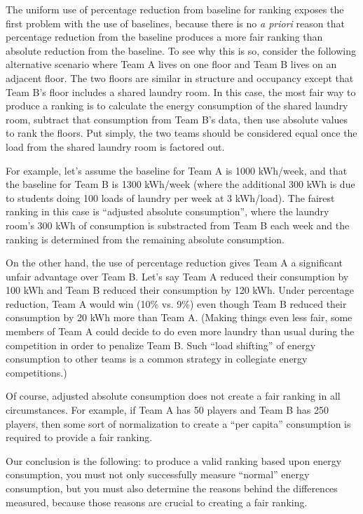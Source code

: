 \documentclass[jou]{apa} %
\begin{document}
The uniform use of percentage reduction from baseline for ranking exposes the first
problem with the use of baselines, because there is no {\em a priori} reason that
percentage reduction from the baseline produces a more fair ranking than absolute
reduction from the baseline.  To see why this is so, consider the following alternative
scenario where Team A lives on one floor and Team B lives on an adjacent floor.  The two
floors are similar in structure and occupancy except that Team B's floor includes a shared
laundry room.  In this case, the most fair way to produce a ranking is to calculate the
energy consumption of the shared laundry room, subtract that consumption from Team B's
data, then use absolute values to rank the floors.  Put simply, the two teams should be
considered equal once the load from the shared laundry room is factored out.

For example, let's assume the baseline for Team A is 1000 kWh/week, and that the baseline
for Team B is 1300 kWh/week (where the additional 300 kWh is due to students doing 100
loads of laundry per week at 3 kWh/load). The fairest ranking in this case is ``adjusted
absolute consumption'', where the laundry room's 300 kWh of consumption is substracted
from Team B each week and the ranking is determined from the remaining absolute 
consumption.

On the other hand, the use of percentage reduction gives Team A a significant unfair
advantage over Team B. Let's say Team A reduced their consumption by 100 kWh and Team B
reduced their consumption by 120 kWh.  Under percentage reduction, Team A would win (10\%
vs. 9\%) even though Team B reduced their consumption by 20 kWh more than Team A.  (Making
things even less fair, some members of Team A could decide to do even more laundry than
usual during the competition in order to penalize Team B.  Such ``load shifting'' of
energy consumption to other teams is a common strategy in collegiate energy competitions.)

Of course, adjusted absolute consumption does not create a fair ranking in all
circumstances. For example, if Team A has 50 players and Team B has 250 players, then some
sort of normalization to create a ``per capita'' consumption is required to provide a fair
ranking. 

Our conclusion is the following: to produce a valid ranking based upon energy consumption,
you must not only successfully measure ``normal'' energy consumption, but you must also
determine the reasons behind the differences measured, because those reasons are crucial
to creating a fair ranking.
\end{document}
